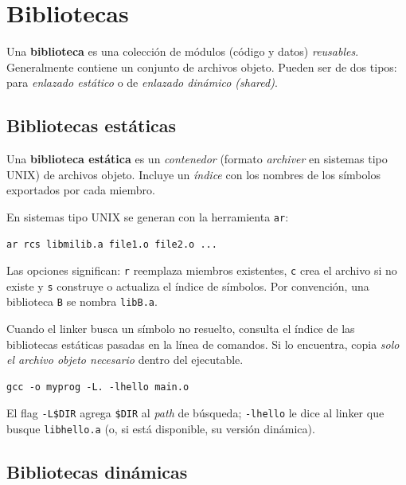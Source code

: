 \documentclass[11pt,a4paper]{article}
\begin{document}
\section{Bibliotecas}

\begin{definicion}
Una \textbf{biblioteca} es una colección de módulos (código y datos)
\emph{reusables}. Generalmente contiene un conjunto de archivos
objeto. Pueden ser de dos tipos: para \emph{enlazado estático} o de
\emph{enlazado dinámico (shared)}.
\end{definicion}

\subsection{Bibliotecas estáticas}

\begin{definicion}
Una \textbf{biblioteca estática} es un \emph{contenedor} (formato
\emph{archiver} en sistemas tipo UNIX) de archivos objeto. Incluye un
\emph{índice} con los nombres de los símbolos exportados por cada
miembro.
\end{definicion}

En sistemas tipo UNIX se generan con la herramienta \texttt{ar}:

\begin{lstlisting}
ar rcs libmilib.a file1.o file2.o ...
\end{lstlisting}

Las opciones significan: \texttt{r} reemplaza miembros existentes,
\texttt{c} crea el archivo si no existe y \texttt{s} construye o
actualiza el índice de símbolos. Por convención, una biblioteca
\texttt{B} se nombra \texttt{libB.a}.

Cuando el linker busca un símbolo no resuelto, consulta el índice de
las bibliotecas estáticas pasadas en la línea de comandos. Si lo
encuentra, copia \emph{solo el archivo objeto necesario} dentro del
ejecutable.

\begin{lstlisting}
gcc -o myprog -L. -lhello main.o
\end{lstlisting}

El flag \texttt{-L\$DIR} agrega \texttt{\$DIR} al \emph{path} de
búsqueda; \texttt{-lhello} le dice al linker que busque
\texttt{libhello.a} (o, si está disponible, su versión dinámica).

\subsection{Bibliotecas dinámicas}
\end{document}
